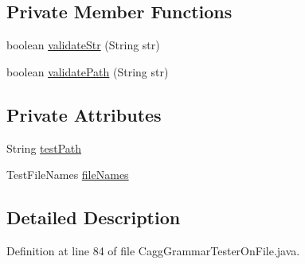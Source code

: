 \subsection*{Private Member Functions}
\begin{DoxyCompactItemize}
\item 
boolean \hyperlink{classit_1_1emarolab_1_1cagg_1_1interfaces_1_1CaggGrammarTesterOnFile_1_1TestPathManager_af1dba9a0af02de26c772f8102294272b}{validate\-Str} (String str)
\item 
boolean \hyperlink{classit_1_1emarolab_1_1cagg_1_1interfaces_1_1CaggGrammarTesterOnFile_1_1TestPathManager_a25fa8ebae5da07e7acd060b44b8c8e34}{validate\-Path} (String str)
\end{DoxyCompactItemize}
\subsection*{Private Attributes}
\begin{DoxyCompactItemize}
\item 
String \hyperlink{classit_1_1emarolab_1_1cagg_1_1interfaces_1_1CaggGrammarTesterOnFile_1_1TestPathManager_a4af055419a5793409f9e49ab20908645}{test\-Path}
\item 
Test\-File\-Names \hyperlink{classit_1_1emarolab_1_1cagg_1_1interfaces_1_1CaggGrammarTesterOnFile_1_1TestPathManager_a52485b2eb5d906945b9af34959ff70f3}{file\-Names}
\end{DoxyCompactItemize}


\subsection{Detailed Description}


Definition at line 84 of file Cagg\-Grammar\-Tester\-On\-File.\-java.



